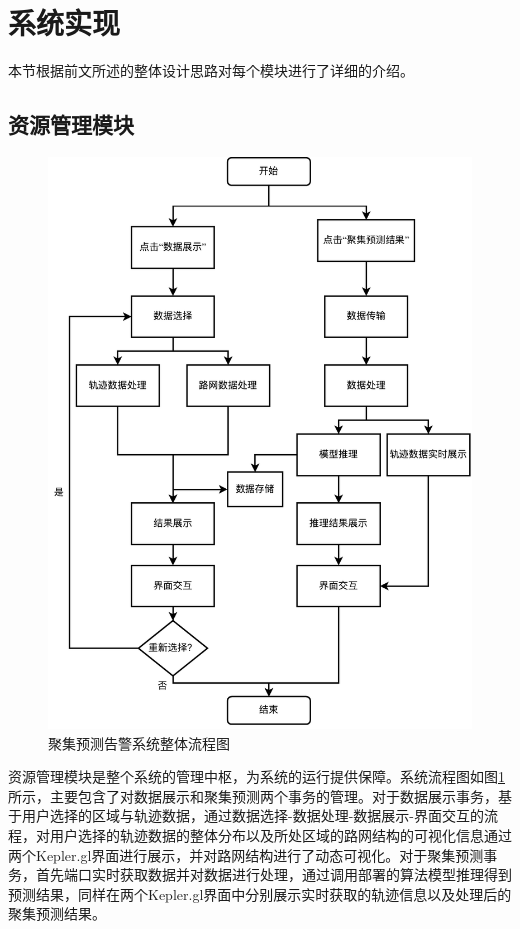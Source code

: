 \documentclass[master]{thesis-uestc}
\begin{document}
\section{系统实现}
本节根据前文所述的整体设计思路对每个模块进行了详细的介绍。
\subsection{资源管理模块}
\begin{figure}[!ht]
\centering
\includegraphics[scale=0.7]{./pic/流程图.pdf}
\caption{聚集预测告警系统整体流程图}
\label{Figure.5.5}
\end{figure}
资源管理模块是整个系统的管理中枢，为系统的运行提供保障。系统流程图如图\ref{Figure.5.5}所示，主要包含了对数据展示和聚集预测两个事务的管理。对于数据展示事务，基于用户选择的区域与轨迹数据，通过数据选择-数据处理-数据展示-界面交互的流程，对用户选择的轨迹数据的整体分布以及所处区域的路网结构的可视化信息通过两个Kepler.gl界面进行展示，并对路网结构进行了动态可视化。对于聚集预测事务，首先端口实时获取数据并对数据进行处理，通过调用部署的算法模型推理得到预测结果，同样在两个Kepler.gl界面中分别展示实时获取的轨迹信息以及处理后的聚集预测结果。
\end{document}
